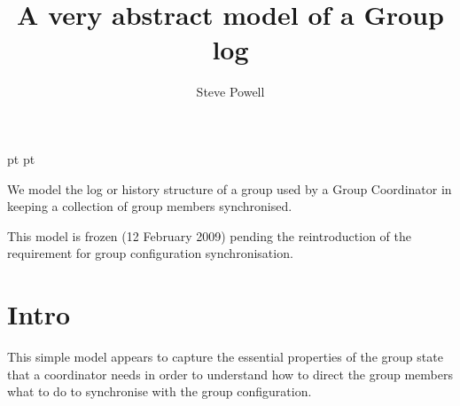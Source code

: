 \documentclass[a4paper,12pt]{article}
\begin{document}
 pt
 pt

\title{A very abstract model of a Group log}
\author{Steve Powell}
\maketitle
\thispagestyle{myheadings}
\setcounter{page}{0}

\noindent
We model the log or history structure of a group used by a Group Coordinator in keeping a collection of group members synchronised.

This model is frozen (12 February 2009) pending the reintroduction of the requirement for group configuration synchronisation.


\newcommand{\true}{true}
\newcommand{\false}{false}
\renewcommand{\emptyset}{\varnothing}
\newcommand{\ModuleDefZero}{ModuleDef_0}
\newcommand{\ModuleDefOne}{ModuleDef_1}
\newcommand{\ModuleDefTwo}{ModuleDef_2}
\newcommand{\ModuleDefThree}{ModuleDef_3}
\newcommand{\ModuleDefFour}{ModuleDef_4}


\clearpage
\tableofcontents

\clearpage
{}
\section{Intro}
This simple model appears to capture the essential properties of the group state that a coordinator needs in order to understand how to direct the group members what to do to synchronise with the group configuration.

    

\clearpage
\end{document}
